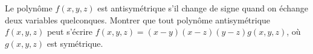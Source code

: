Le polynôme $f(x, y, z)$ est antisymétrique s'il change de signe quand on échange deux variables quelconques. Montrer que tout polynôme antisymétrique $f(x, y, z)$ peut s'écrire $f(x, y, z) = (x - y)(x - z)(y - z)g(x, y, z)$, où $g(x, y, z)$ est symétrique.
